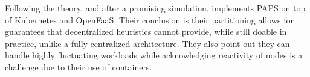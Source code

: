 \documentclass[11pt]{sdm}
\begin{document}
\begin{description}
	Following the theory, and after a promising simulation, \citet{baresi_paps_2021} implements \gls{PAPS} on top of Kubernetes and OpenFaaS. Their conclusion is their partitioning allows for guarantees that decentralized heuristics cannot provide, while still doable in practice, unlike a fully centralized architecture. They also point out they can handle highly fluctuating workloads while acknowledging reactivity of nodes is a challenge due to their use of containers.
	
	

\end{description}
\end{document}
